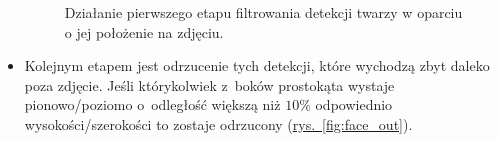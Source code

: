 \begin{itemize}
\begin{figure}[!h]
\begin{center}
        \end{center}
        \caption{Działanie pierwszego etapu filtrowania detekcji twarzy w oparciu o jej położenie na zdjęciu.}
        \label{fig:face_boundary}
    \end{figure}
    
    \item Kolejnym etapem jest odrzucenie tych detekcji, które wychodzą zbyt daleko poza zdjęcie. Jeśli którykolwiek z~boków prostokąta wystaje pionowo/poziomo o~odległość większą niż $10\%$ odpowiednio wysokości/szerokości to zostaje odrzucony (\hyperref[{fig:face_out}]{rys.~\ref{fig:face_out}}).
    

\end{itemize}
